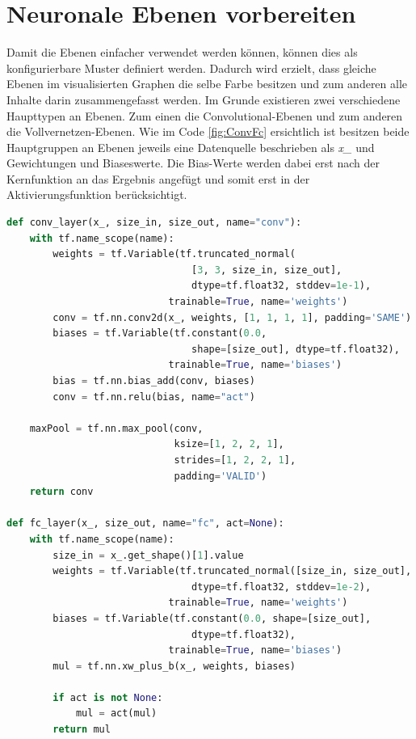 \section{Neuronale Ebenen vorbereiten}

Damit die Ebenen einfacher verwendet werden können, können dies als konfigurierbare Muster definiert werden. 
Dadurch wird erzielt, dass gleiche Ebenen im visualisierten Graphen die selbe Farbe besitzen und zum anderen alle Inhalte darin zusammengefasst werden. 
Im Grunde existieren zwei verschiedene Haupttypen an Ebenen. 
Zum einen die Convolutional-Ebenen und zum anderen die Vollvernetzen-Ebenen. 
Wie im Code \ref{fig:ConvFc} ersichtlich ist besitzen beide Hauptgruppen an Ebenen jeweils eine Datenquelle beschrieben als \textit{x\_} und Gewichtungen und Biaseswerte. 
Die Bias-Werte werden dabei erst nach der Kernfunktion an das Ergebnis angefügt und somit erst in der Aktivierungsfunktion berücksichtigt. 
\begin{lstlisting}[caption={Definition der Convolutional- und Vollvernetzen-Ebenen},label=fig:ConvFc,captionpos=b,language=Python]
def conv_layer(x_, size_in, size_out, name="conv"):
    with tf.name_scope(name):
        weights = tf.Variable(tf.truncated_normal(
        						[3, 3, size_in, size_out], 
        						dtype=tf.float32, stddev=1e-1), 
							trainable=True, name='weights')
        conv = tf.nn.conv2d(x_, weights, [1, 1, 1, 1], padding='SAME')
        biases = tf.Variable(tf.constant(0.0, 
								shape=[size_out], dtype=tf.float32), 
                            trainable=True, name='biases')
        bias = tf.nn.bias_add(conv, biases)
        conv = tf.nn.relu(bias, name="act")

    maxPool = tf.nn.max_pool(conv, 
                             ksize=[1, 2, 2, 1],
                             strides=[1, 2, 2, 1],
                             padding='VALID')
    return conv

def fc_layer(x_, size_out, name="fc", act=None):
    with tf.name_scope(name):
        size_in = x_.get_shape()[1].value
        weights = tf.Variable(tf.truncated_normal([size_in, size_out], 
								dtype=tf.float32, stddev=1e-2), 
							trainable=True, name='weights')
        biases = tf.Variable(tf.constant(0.0, shape=[size_out], 
								dtype=tf.float32), 
							trainable=True, name='biases')
        mul = tf.nn.xw_plus_b(x_, weights, biases)
        
        if act is not None:
            mul = act(mul)
        return mul
\end{lstlisting}

